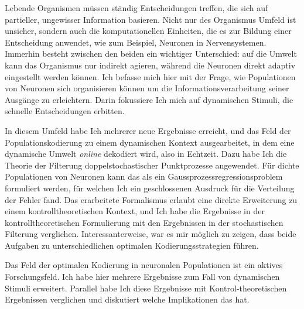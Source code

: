 
Lebende Organismen m\"ussen st\"andig Entscheidungen treffen, die sich auf partieller, ungewisser Information basieren. Nicht nur des Organismus Umfeld ist unsicher, sondern auch die
komputationellen Einheiten, die es zur Bildung einer Entscheidung anwendet, wie zum Beispiel, Neuronen in Nervensystemen. Immerhin besteht zwischen den beiden ein wichtiger
Unterschied: auf die Umwelt kann das Organismus nur indirekt agieren, w\"ahrend die Neuronen direkt adaptiv eingestellt werden k\"onnen. Ich befasse mich hier mit der Frage, wie
Populationen von Neuronen sich organisieren k\"onnen um die Informationsverarbeitung seiner Ausg\"ange zu erleichtern. Darin fokussiere Ich mich auf dynamischen Stimuli, die
schnelle Entscheidungen erbitten.\par

In diesem Umfeld habe Ich mehrerer neue Ergebnisse erreicht, und das Feld der Populationskodierung zu einem dynamischen Kontext ausgearbeitet, in dem eine dynamische Umwelt
\emph{online} dekodiert wird, also in Echtzeit. Dazu habe Ich die Theorie der Filterung doppelstochastischer Punktprozesse angewendet. F\"ur dichte Populationen von Neuronen kann
das als ein Gaussprozessregressionsproblem formuliert werden, f\"ur welchen Ich ein geschlossenen Ausdruck f\"ur die Verteilung der Fehler fand. Das erarbeitete Formalismus erlaubt eine direkte
Erweiterung zu einem kontrolltheoretischen Kontext, und Ich habe die Ergebnisse in der kontrolltheoretischen Formulierung mit den Ergebnissen in der stochastischen Filterung verglichen.
Interessanterweise, war es mir m\"oglich zu zeigen, dass beide Aufgaben zu unterschiedlichen optimalen Kodierungsstrategien f\"uhren.\par

Das Feld der optimalen Kodierung in neuronalen Populationen ist ein aktives Forschungsfeld. Ich habe hier mehrere Ergebnisse zum Fall von dynamischen Stimuli erweitert. Parallel
habe Ich diese Ergebnisse mit Kontrol-theoretischen Ergebnissen verglichen und diskutiert welche Implikationen das hat.